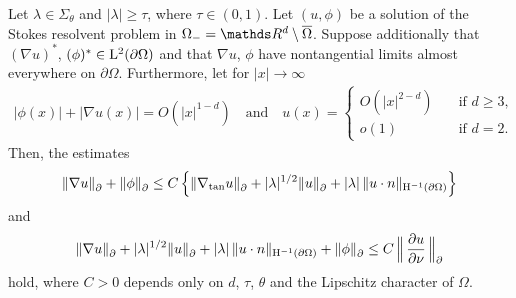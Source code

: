 \begin{thm}
  \label{thm:rellichExterior}
  Let $\lambda \in \Sigma_\theta$ and $|\lambda| \geq \tau$, where $\tau \in (0,1)$.
  Let $(u,\phi)$ be a solution of the Stokes resolvent problem in $\Omega_- = \R^d \setminus \overline\Omega$.
  Suppose additionally that $(\nabla u)^*$, $(\phi)^* \in \mathrm{L}^2(\partial\Omega)$ and that $\nabla u$, $\phi$ have nontangential limits almost everywhere on $\partial\Omega$.
  Furthermore, let for $|x| \to \infty$
  \begin{align*}
    |\phi(x)| + |\nabla u(x)| = O(|x|^{1 - d}) \quad\text{and}\quad 
    u(x) = \begin{cases} O(|x|^{2 - d}) &\quad\text{if } d \geq 3, \\ o(1) &\quad\text{if } d = 2. \end{cases}
  \end{align*}
  Then, the estimates
  \begin{align}
    \label{eq:rellich1ext}
    \|\nabla u\|^{}_\partial + \|\phi\|^{}_\partial
    \leq C\, \Big\{ \|\nabla_{\mathrm{tan}} u\|^{}_\partial + |\lambda|^{1/2} \|u\|^{}_\partial + |\lambda|\, \|u \cdot n\|_{\mathrm{H}^{-1}(\partial\Omega)} \Big\}
  \end{align}
  and
  \begin{align}
    \label{eq:rellich2ext}
    \|\nabla u\|^{}_\partial + |\lambda|^{1/2} \|u\|^{}_\partial + |\lambda| \, \|u \cdot n\|_{\mathrm{H}^{-1}(\partial\Omega)} + \|\phi\|^{}_\partial
    \leq C \, \Big\|\,\frac{\partial u}{\partial \nu} \,\Big\|^{}_\partial
  \end{align}
  hold, where $C > 0$ depends only on $d$, $\tau$, $\theta$ and the Lipschitz character of $\Omega$.
\end{thm}
